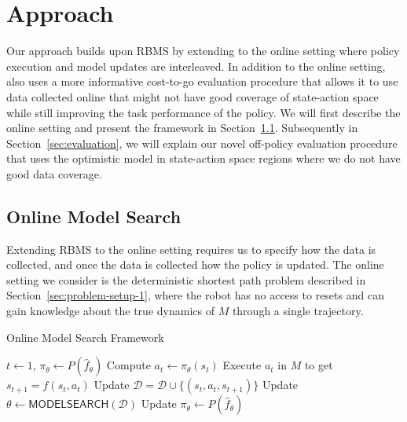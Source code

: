 \section{Approach}
\label{sec:approach-2}

Our approach \taml{} builds upon RBMS by extending to the online
setting where policy execution and model updates are interleaved. In
addition to the online setting, \taml{} also uses a more informative
cost-to-go evaluation procedure that allows it to use data collected
online that might not have good coverage of state-action space while
still improving the task performance of the policy. We will first
describe the online setting and present the framework in
Section~\ref{sec:online-setting}. Subsequently in
Section~\ref{sec:evaluation}, we will explain our 
novel off-policy evaluation procedure that uses the optimistic model in
state-action space regions where we do not have good data coverage.

\subsection{Online Model Search}
\label{sec:online-setting}
Extending RBMS to the online setting requires us to specify how the
data is collected, and once the data is collected how the policy is
updated. The online setting we consider is the deterministic shortest
path problem described in Section~\ref{sec:problem-setup-1}, where the
robot has no access to resets and can gain knowledge about the true
dynamics of $M$ through a single trajectory.

\begin{algorithm}[t]
  \caption{Online Model Search Framework}
  \begin{algorithmic}[1]
    \State $t \leftarrow 1$, $\pi_\theta \leftarrow P(\hat{f}_\theta)$
    \State Compute $a_t \leftarrow \pi_\theta(s_t)$
    \State Execute $a_t$ in $M$ to get $s_{t+1} = f(s_t, a_t)$
    \State Update $\mathcal{D} = \mathcal{D} \cup \{(s_t, a_t,
    s_{t+1})\}$
    \State Update $\theta \leftarrow
    \mathsf{MODELSEARCH}(\mathcal{D})$
    \State Update $\pi_\theta \leftarrow P(\hat{f}_\theta)$
    \EndIf
    \EndWhile
  \end{algorithmic}
  \label{alg:online-model-search}
\end{algorithm}

